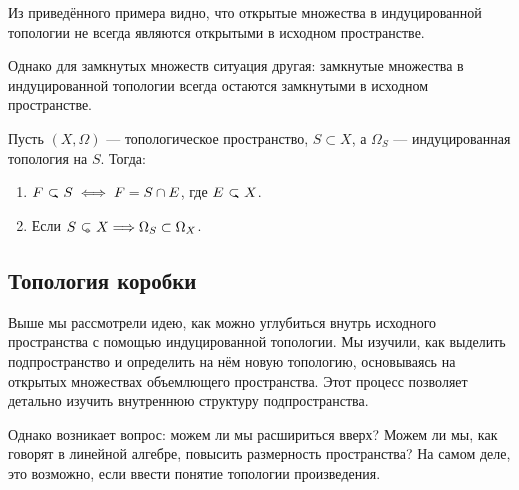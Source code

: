 Из приведённого примера видно, что открытые множества в индуцированной топологии не всегда являются открытыми в исходном пространстве. 

Однако для замкнутых множеств ситуация другая: замкнутые множества в индуцированной топологии всегда остаются замкнутыми в исходном пространстве. 

\begin{statement}
	Пусть \( (X, \Omega) \) — топологическое пространство, \( S \subset X \), а \( \Omega_S \) — индуцированная топология на \(S\). Тогда:
	\begin{enumerate}
		\item \(F \closed S \iff F = S \cap E\), где \(E \closed X\).
		\item Если \(S \open X \Longrightarrow \Omega_S \subset \Omega_X\).
	\end{enumerate}
\end{statement}

\subsection{Топология коробки}

Выше мы рассмотрели идею, как можно углубиться внутрь исходного пространства с помощью индуцированной топологии. Мы изучили, как выделить подпространство и определить на нём новую топологию, основываясь на открытых множествах объемлющего пространства. Этот процесс позволяет детально изучить внутреннюю структуру подпространства.

Однако возникает вопрос: можем ли мы расшириться вверх? Можем ли мы, как говорят в линейной алгебре, повысить размерность пространства? На самом деле, это возможно, если ввести понятие топологии произведения.

